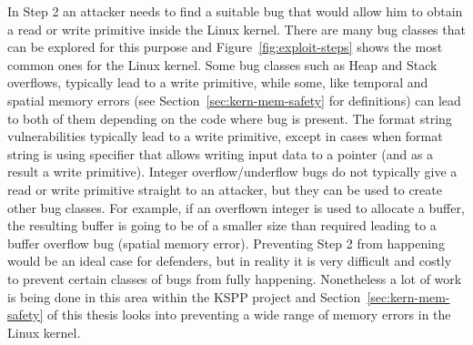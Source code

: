 In Step 2 an attacker needs to find a suitable bug that would allow him to obtain a read or write primitive inside the Linux kernel. There are many bug classes that can be explored for this purpose and Figure~\ref{fig:exploit-steps} shows the most common ones for the Linux kernel. Some bug classes such as Heap and Stack overflows, typically lead to a write primitive, while some, like temporal and spatial memory errors (see Section~\ref{sec:kern-mem-safety} for definitions) can lead to both of them depending on the code where bug is present. The format string vulnerabilities typically lead to a write primitive, except in cases when format string is using  specifier that allows writing input data to a pointer (and as a result a write primitive). Integer overflow/underflow bugs do not typically give a read or write primitive straight to an attacker, but they can be used to create other bug classes. For example, if an overflown integer is used to allocate a buffer, the resulting buffer is going to be of a smaller size than required leading to a buffer overflow bug (spatial memory error). Preventing Step 2 from happening would be an ideal case for defenders, but in reality it is very difficult and costly to prevent certain classes of bugs from fully happening. Nonetheless a lot of work is being done in this area within the KSPP project and Section~\ref{sec:kern-mem-safety} of this thesis looks into preventing a wide range of memory errors in the Linux kernel. 

